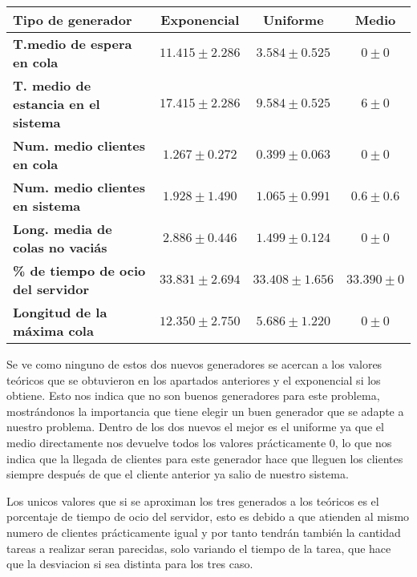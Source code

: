 \documentclass[]{article}
\begin{document}
\begin{table}[H]
	\begin{center}
		\begin{tabularx}{1\textwidth}{|X|c|c|c|}
			\hline
			\textbf{Tipo de generador}&\textbf{ Exponencial} &  \textbf{Uniforme} & \textbf{Medio} \\
			\hline \hline
			\textbf{T.medio de espera en cola}& $11.415\pm2.286$ & $3.584\pm0.525$ & $0\pm0$ \\ \hline
			\textbf{T. medio de estancia en el sistema} & $17.415\pm2.286$ & $9.584\pm0.525$ & $6\pm0$ \\ \hline
			\textbf{Num. medio clientes en cola} & $1.267\pm0.272$& $0.399\pm0.063$ & $0\pm0$ \\  \hline
			\textbf{Num. medio clientes en sistema} & $1.928\pm1.490$ & $1.065\pm0.991$ & $0.6\pm0.6$ \\ \hline
			\textbf{Long. media de colas no vaciás} & $2.886\pm0.446$& $1.499\pm0.124$ & $0\pm0$ \\ \hline
			\textbf{\% de tiempo de ocio del servidor} & $33.831\pm2.694$ & $33.408\pm1.656$ & $33.390\pm0$ \\ \hline
			\textbf{Longitud de la máxima cola} &$12.350\pm2.750$& $5.686\pm1.220$ & $0\pm0$    \\ \hline
		\end{tabularx}
		
	\end{center}
	\end{table}
Se ve como ninguno de estos dos nuevos generadores se acercan a los valores teóricos que se obtuvieron en los apartados anteriores y el exponencial si los obtiene. Esto nos indica que no son  buenos generadores para este problema, mostrándonos la importancia que tiene elegir un buen generador que se adapte a nuestro problema. Dentro de los dos nuevos el mejor es el uniforme ya que el medio directamente nos devuelve todos los valores prácticamente 0, lo que nos indica que la llegada de clientes para este generador hace que lleguen los clientes siempre después de que el cliente anterior ya salio de nuestro sistema.

Los unicos valores que si se aproximan los tres generados a los teóricos es el porcentaje de tiempo de ocio del servidor, esto es debido a que atienden al mismo numero de clientes prácticamente igual y por tanto tendrán también la cantidad tareas a realizar seran parecidas, solo variando el tiempo de la tarea, que hace que la desviacion si sea distinta para los tres caso.
\end{document}
